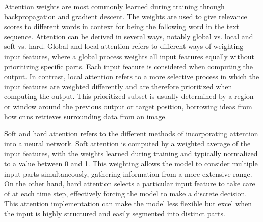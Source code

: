     
    Attention weights are most commonly learned during training through backpropagation and gradient descent. The weights are used to give relevance scores to different words in context for being the following word in the text sequence. Attention can be derived in several ways, notably global vs. local and soft vs. hard. Global and local attention refers to different ways of weighting input features, where a global process weights all input features equally without prioritizing specific parts. Each input feature is considered when computing the output.
    In contrast, local attention refers to a more selective process in which the input features are weighted differently and are therefore prioritized when computing the output. This prioritized subset is usually determined by a region or window around the previous output or target position, borrowing ideas from how \glspl{cnn} retrieves surrounding data from an image.
    
    Soft and hard attention refers to the different methods of incorporating attention into a neural network. Soft attention is computed by a weighted average of the input features, with the weights learned during training and typically normalized to a value between 0 and 1. This weighting allows the model to consider multiple input parts simultaneously, gathering information from a more extensive range. On the other hand, hard attention selects a particular input feature to take care of at each time step, effectively forcing the model to make a discrete decision. This attention implementation can make the model less flexible but excel when the input is highly structured and easily segmented into distinct parts.


    







    




